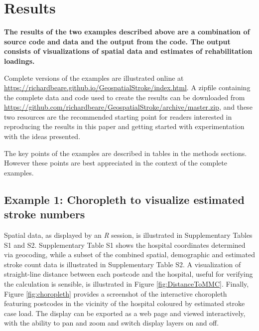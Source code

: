 \documentclass[utf8]{frontiersHLTH}
\begin{document}
\section{Results}
{\bf
The results of the two examples described above are a combination of
source code and data and the output from the code. The output consists
of visualizations of spatial data and estimates of rehabilitation
loadings.

Complete versions of the examples are illustrated online at
\url{https://richardbeare.github.io/GeospatialStroke/index.html}.  A
zipfile containing the complete data and code used to create the
results can be downloaded from
\url{https://github.com/richardbeare/GeospatialStroke/archive/master.zip},
and these two resources are the recommended starting point for readers
interested in reproducing the results in this paper and getting
started with experimentation with the ideas presented.

The key points of the examples are described in tables in the methods
sections. However these points are best appreciated in the context of
the complete examples.
}
\subsection{Example 1: Choropleth to visualize estimated stroke numbers} 
Spatial data, as displayed by an {\em R} session, is illustrated in
Supplementary Tables S1 and S2. Supplementary Table S1 shows the
hospital coordinates determined via geocoding, while a subset of the
combined spatial, demographic and estimated stroke count data is
illustrated in Supplementary Table S2. A visualization of
straight-line distance between each postcode and the hospital, useful
for verifying the calculation is sensible, is illustrated in Figure
\ref{fig:DistanceToMMC}. Finally, Figure \ref{fig:choropleth} provides
a screenshot of the interactive choropleth featuring postcodes in the
vicinity of the hospital coloured by estimated stroke case load. The
display can be exported as a web page and viewed interactively, with
the ability to pan and zoom and switch display layers on and off.
\end{document}
